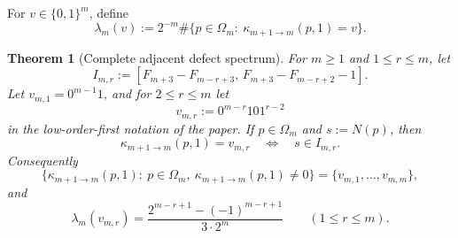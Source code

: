 \documentclass[11pt,reqno]{amsart}
\numberwithin{equation}{section}
\theoremstyle{plain}
\newtheorem{theorem}{Theorem}[section]
\theoremstyle{definition}
\theoremstyle{remark}
\begin{document}
For $v\in\{0,1\}^m$, define
\[
\lambda_m(v):=2^{-m}\#\{p\in\Omega_m:\ \kappa_{m+1\to m}(p,1)=v\}.
\]

\begin{theorem}[Complete adjacent defect spectrum]
\label{thm:adjacent-spectrum}
For $m\ge 1$ and $1\le r\le m$, let
\[
I_{m,r}
:=
[F_{m+3}-F_{m-r+3},\,F_{m+3}-F_{m-r+2}-1].
\]
Let $v_{m,1}=0^{m-1}1$, and for $2\le r\le m$ let
\[
v_{m,r}:=0^{m-r}10 1^{r-2}
\]
in the low-order-first notation of the paper.  If $p\in\Omega_m$ and
$s:=N(p)$, then
\[
\kappa_{m+1\to m}(p,1)=v_{m,r}
\quad\Longleftrightarrow\quad
s\in I_{m,r}.
\]
Consequently
\[
\{\kappa_{m+1\to m}(p,1):\ p\in\Omega_m,\ \kappa_{m+1\to m}(p,1)\ne 0\}
=
\{v_{m,1},\dots,v_{m,m}\},
\]
and
\[
\lambda_m(v_{m,r})
=
\frac{2^{m-r+1}-(-1)^{m-r+1}}{3\cdot 2^m}
\qquad (1\le r\le m).
\]
\end{theorem}
\end{document}
